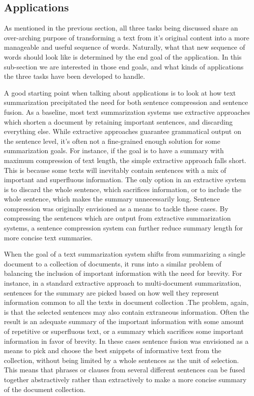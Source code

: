 \subsection{Applications}


{As mentioned in the previous section, all three tasks being discussed share an over-arching purpose of transforming a text from it's original content into a more manageable and useful sequence of words. Naturally, what that new sequence of words should look like is determined by the end goal of the application. In this sub-section we are interested in those end goals, and what kinds of applications the three tasks have been developed to handle.}

{A good starting point when talking about applications is to look at how text summarization precipitated the need for both sentence compression and sentence fusion.  As a baseline, most text summarization systems use extractive approaches which shorten a document by retaining important sentences, and discarding everything else.  While extractive approaches guarantee grammatical output on the sentence level, it's often not a fine-grained enough solution for some summarization goals.  For instance, if the goal is to have a summary with maximum compression of text length, the simple extractive approach falls short.  This is because some texts will inevitably contain sentences with a mix of important and superfluous information.  The only option in an extractive system is to discard the whole sentence, which sacrifices information, or to include the whole sentence, which makes the summary unnecessarily long.  Sentence compression was originally envisioned as a means to tackle these cases.  By compressing the sentences which are output from extractive summarization systems, a sentence compression system can further reduce summary length for more concise text summaries\citet{Jing2000}.}

{When the goal of a text summarization system shifts from summarizing a single document to a collection of documents, it runs into a similar problem of balancing the inclusion of important information with the need for brevity.  For instance, in a standard extractive approach to multi-document summarization, sentences for the summary are picked based on how well they represent information common to all the texts in document collection \citet{bla}.The problem, again, is that the selected sentences may also contain extraneous information. Often the result is an adequate summary of the important information with some amount of repetitive or superfluous text, or a summary which sacrifices some important information in favor of brevity. In these cases sentence fusion was envisioned as a means to pick and choose the best snippets of informative text from the collection, without being limited by a whole sentences as the unit of selection\citet{bla}.  This means that phrases or clauses from several different sentences can be fused together abstractively rather than extractively to make a more concise summary of the document collection.}


